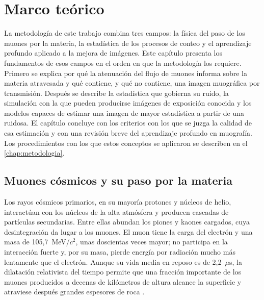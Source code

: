 \chapter{Marco teórico}
\label{chap:marco-teorico}

La metodología de este trabajo combina tres campos: la física del paso de los muones por la materia, la estadística de los procesos de conteo y el aprendizaje profundo aplicado a la mejora de imágenes. Este capítulo presenta los fundamentos de esos campos en el orden en que la metodología los requiere. Primero se explica por qué la atenuación del flujo de muones informa sobre la materia atravesada y qué contiene, y qué no contiene, una imagen muográfica por transmisión. Después se describe la estadística que gobierna su ruido, la simulación con la que pueden producirse imágenes de exposición conocida y los modelos capaces de estimar una imagen de mayor estadística a partir de una ruidosa. El capítulo concluye con los criterios con los que se juzga la calidad de esa estimación y con una revisión breve del aprendizaje profundo en muografía. Los procedimientos con los que estos conceptos se aplicaron se describen en el \cref{chap:metodologia}.

\section{Muones cósmicos y su paso por la materia}
\label{sec:mt-muones}

Los rayos cósmicos primarios, en su mayoría protones y núcleos de helio, interactúan con los núcleos de la alta atmósfera y producen cascadas de partículas secundarias. Entre ellas abundan los piones y kaones cargados, cuya desintegración da lugar a los muones. El muon tiene la carga del electrón y una masa de 105,7~MeV/$c^{2}$, unas doscientas veces mayor; no participa en la interacción fuerte y, por su masa, pierde energía por radiación mucho más lentamente que el electrón. Aunque su vida media en reposo es de 2,2~$\mu$s, la dilatación relativista del tiempo permite que una fracción importante de los muones producidos a decenas de kilómetros de altura alcance la superficie y atraviese después grandes espesores de roca \parencite{gaisser2016,pdg2022}.

